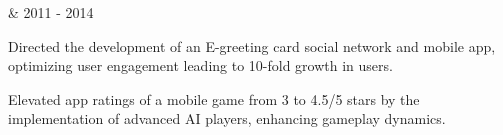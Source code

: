 \begin{cventries}


  \cventrythin
    { \& } %
    {2011 - 2014} %
    {
          \begin{cvitems} %
				\item {Directed the development of an E-greeting card social network and mobile app, optimizing user engagement leading to 10-fold growth in users.}
	          	\item {Elevated app ratings of a mobile game from 3 to 4.5/5 stars by the implementation of advanced AI players, enhancing gameplay dynamics.}
	      \end{cvitems}
    }




    
    


    
    




\end{cventries}
